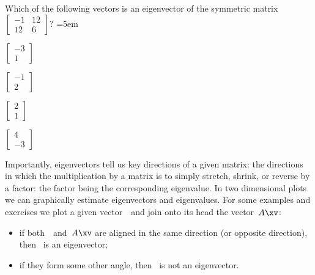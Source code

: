 \begin{activity}
Which of the following vectors is an eigenvector of the symmetric matrix \(\begin{bmatrix} -1&12\\12&6 \end{bmatrix}\)?
\partswidth=5em
\begin{parts}
\item \(\begin{bmatrix} -3\\1 \end{bmatrix}\)
\item \(\begin{bmatrix} -1\\2 \end{bmatrix}\)
\item \(\begin{bmatrix} 2\\1 \end{bmatrix}\)
\item \(\begin{bmatrix} 4\\-3 \end{bmatrix}\)
\end{parts}
\end{activity}



Importantly, eigenvectors tell us key directions of a given matrix: the directions in which the multiplication by a matrix is to simply stretch, shrink, or reverse by a factor: the factor being the corresponding eigenvalue.
In two dimensional plots we can graphically estimate eigenvectors and eigenvalues.
For some examples and exercises we plot a given vector~\xv\ and join onto its head the vector~\(A\xv\): \begin{itemize}
\item if both~\xv\ and~\(A\xv\) are aligned in the same direction (or opposite direction), then \xv~is an eigenvector; 
\item if they form some other angle, then \xv~is not an eigenvector.
\end{itemize}
  

